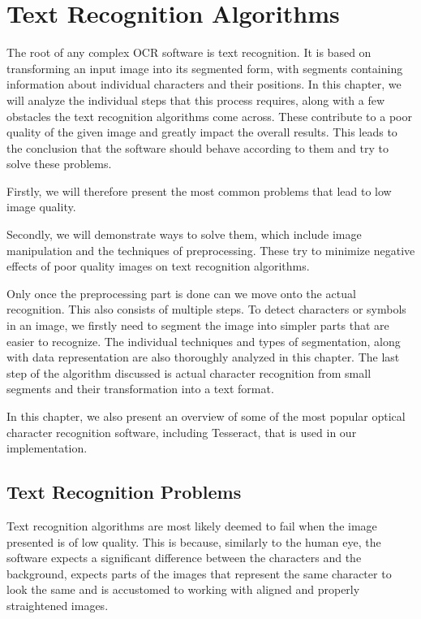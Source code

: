 \chapter{Text Recognition Algorithms}

The root of any complex OCR software is text recognition. It is based on transforming an input image into its segmented form, with segments containing information about individual characters and their positions. In this chapter, we will analyze the individual steps that this process requires, along with a few obstacles the text recognition algorithms come across. These contribute to a poor quality of the given image and greatly impact the overall results. This leads to the conclusion that the software should behave according to them and try to solve these problems.

Firstly, we will therefore present the most common problems that lead to low image quality.

Secondly, we will demonstrate ways to solve them, which include image manipulation and the techniques of preprocessing. These try to minimize negative effects of poor quality images on text recognition algorithms.

Only once the preprocessing part is done can we move onto the actual recognition. This also consists of multiple steps. To detect characters or symbols in an image, we firstly need to segment the image into simpler parts that are easier to recognize. The individual techniques and types of segmentation, along with data representation are also thoroughly analyzed in this chapter. The last step of the algorithm discussed is actual character recognition from small segments and their transformation into a text format.

In this chapter, we also present an overview of some of the most popular optical character recognition software, including Tesseract, that is used in our implementation.

\section{Text Recognition Problems}


Text recognition algorithms are most likely deemed to fail when the image presented is of low quality. This is because, similarly to the human eye, the software expects a significant difference between the characters and the background, expects parts of the images that represent the same character to look the same and is accustomed to working with aligned and properly straightened images.

